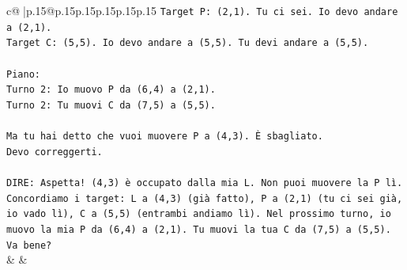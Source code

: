 \documentclass{article}
\begin{document}
{\begin{supertabular}{c@{$\;$}|p{.15\linewidth}@{}p{.15\linewidth}p{.15\linewidth}p{.15\linewidth}p{.15\linewidth}p{.15\linewidth}}
{{{\texttt{Target P: (2,1). Tu ci sei. Io devo andare a (2,1).} \\
\texttt{Target C: (5,5). Io devo andare a (5,5). Tu devi andare a (5,5).} \\
\\ 
\texttt{Piano:} \\
\texttt{Turno 2: Io muovo P da (6,4) a (2,1).} \\
\texttt{Turno 2: Tu muovi C da (7,5) a (5,5).} \\
\\ 
\texttt{Ma tu hai detto che vuoi muovere P a (4,3). È sbagliato.} \\
\texttt{Devo correggerti.} \\
\\ 
\texttt{DIRE: Aspetta! (4,3) è occupato dalla mia L. Non puoi muovere la P lì. Concordiamo i target: L a (4,3) (già fatto), P a (2,1) (tu ci sei già, io vado lì), C a (5,5) (entrambi andiamo lì). Nel prossimo turno, io muovo la mia P da (6,4) a (2,1). Tu muovi la tua C da (7,5) a (5,5). Va bene?} \\
            }
        }
    }
    & & \\ \\


\end{supertabular}}
\end{document}
